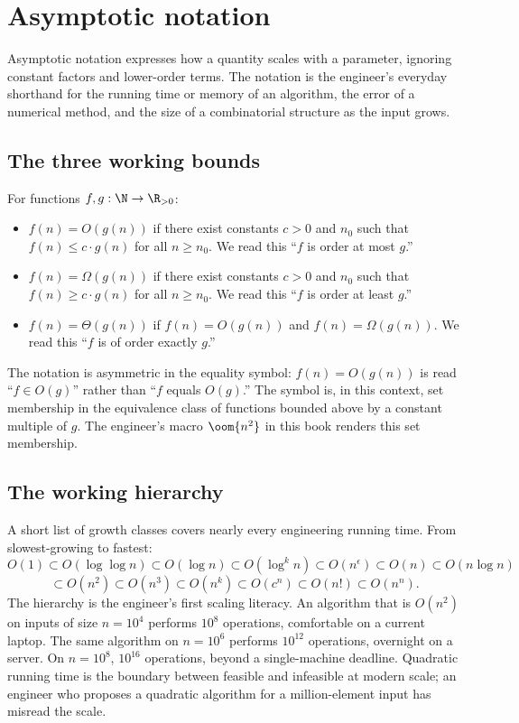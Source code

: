 \section{Asymptotic notation}

Asymptotic notation expresses how a quantity scales with a
parameter, ignoring constant factors and lower-order terms. The
notation is the engineer's everyday shorthand for the running time
or memory of an algorithm, the error of a numerical method, and the
size of a combinatorial structure as the input grows.

\subsection{The three working bounds}

\begin{definition}
For functions $f, g: \N \to \R_{>0}$:
\begin{itemize}[leftmargin=*]
  \item $f(n) = O(g(n))$ if there exist constants $c > 0$ and
    $n_{0}$ such that $f(n) \leq c \cdot g(n)$ for all $n \geq
    n_{0}$. We read this ``$f$ is order at most $g$.''
  \item $f(n) = \Omega(g(n))$ if there exist constants $c > 0$ and
    $n_{0}$ such that $f(n) \geq c \cdot g(n)$ for all $n \geq
    n_{0}$. We read this ``$f$ is order at least $g$.''
  \item $f(n) = \Theta(g(n))$ if $f(n) = O(g(n))$ and $f(n) =
    \Omega(g(n))$. We read this ``$f$ is of order exactly $g$.''
\end{itemize}
\end{definition}

The notation is asymmetric in the equality symbol: $f(n) = O(g(n))$
is read ``$f \in O(g)$'' rather than ``$f$ equals $O(g)$.'' The
symbol is, in this context, set membership in the equivalence class
of functions bounded above by a constant multiple of $g$. The
engineer's macro $\oom{n^{2}}$ in this book renders this set
membership.

\subsection{The working hierarchy}

A short list of growth classes covers nearly every engineering
running time. From slowest-growing to fastest:
\[
O(1) \subset O(\log \log n) \subset O(\log n) \subset O(\log^{k} n)
\subset O(n^{\epsilon}) \subset O(n) \subset O(n \log n)
\]
\[
\subset O(n^{2}) \subset O(n^{3}) \subset O(n^{k}) \subset O(c^{n})
\subset O(n!) \subset O(n^{n}).
\]
The hierarchy is the engineer's first scaling literacy. An
algorithm that is $O(n^{2})$ on inputs of size $n = 10^{4}$
performs $10^{8}$ operations, comfortable on a current laptop. The
same algorithm on $n = 10^{6}$ performs $10^{12}$ operations,
overnight on a server. On $n = 10^{8}$, $10^{16}$ operations,
beyond a single-machine deadline. Quadratic running time is the
boundary between feasible and infeasible at modern scale; an
engineer who proposes a quadratic algorithm for a million-element
input has misread the scale.

